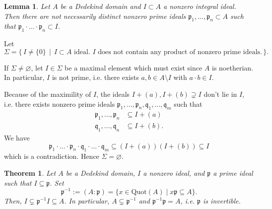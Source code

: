 \documentclass[a4paper]{book}
\theoremstyle{break}
\theoremstyle{plain}
\newtheorem{theorem}{Theorem}[definition]
\newtheorem{lemma}{Lemma}[definition]
\begin{document}
\begin{lemma}
    Let \(A\) be a {\color{mathif}Dedekind domain} and \(I \subset A\) a {\color{mathif}nonzero integral ideal}. Then there are not necessarily distinct {\color{maththen}nonzero prime ideals} \(\mathfrak{p}_1, \dots, \mathfrak{p}_n \subset A\) such that \(\mathfrak{p}_1 \cdot \dots \cdot \mathfrak{p}_n \subset I\).
\end{lemma}


Let
\begin{equation}
    \Sigma = \{\, I \neq \{0\} \, \mid \, I \subset A \text{ ideal. \(I\) does not contain any product of nonzero prime ideals.} \, \} \text{.}
\end{equation}

If \(\Sigma \neq \varnothing\), let \(I \in \Sigma\) be a maximal element which must exist since \(A\) is noetherian. In particular, \(I\) is not prime, i.e. there exists \(a, b \in A \setminus I\) with \(a \cdot b \in I\). %

Because of the maximility of \(I\), the ideals \(I + (a), I + (b) \supsetneq I\) don't lie in \(I\), i.e. there exists nonzero prime ideals \(\mathfrak{p}_1, \dots, \mathfrak{p}_n, \mathfrak{q}_1, \dots, \mathfrak{q}_m\) such that
\begin{align}
    \mathfrak{p}_1, \dots, \mathfrak{p}_n &\subseteq I + (a) \\
    \mathfrak{q}_1, \dots, \mathfrak{q}_n &\subseteq I + (b) \text{.}
\end{align}
We have
\begin{equation}
    \mathfrak{p}_1 \cdot \dots \cdot \mathfrak{p}_n \cdot \mathfrak{q}_1 \cdot \dots \cdot \mathfrak{q}_m \subseteq (I + (a))(I + (b)) \subseteq I
\end{equation}
which is a contradiction. Hence \(\Sigma = \varnothing\).

\begin{theorem}
    Let \(A\) be a Dedekind domain, \(I\) a nonzero ideal, and \(\mathfrak{p}\) a prime ideal such that \(I \subseteq \mathfrak{p}\). Set
    \begin{equation}
        \mathfrak{p}^{-1} := (A : \mathfrak{p}) = \{x \in \text{Quot}(A) \mid x \mathfrak{p} \subseteq A\} \text{.}
    \end{equation}
    Then, \(I \subsetneq \mathfrak{p}^{-1} I \subseteq A\). In particular, \(A \subsetneq \mathfrak{p}^{-1}\) and \(\mathfrak{p}^{-1}\mathfrak{p} = A\), i.e. \(\mathfrak{p}\) is invertible.
\end{theorem}
\end{document}
